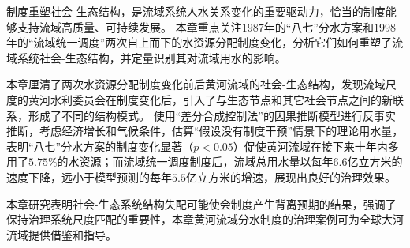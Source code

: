 制度重塑社会-生态结构，是流域系统人水关系变化的重要驱动力，恰当的制度能够支持流域高质量、可持续发展。
本章重点关注$1987$年的“八七”分水方案和$1998$年的“流域统一调度”两次自上而下的水资源分配制度变化，分析它们如何重塑了流域系统社会-生态结构，并定量识别其对流域用水的影响。

本章厘清了两次水资源分配制度变化前后黄河流域的社会-生态结构，发现流域尺度的黄河水利委员会在制度变化后，引入了与生态节点和其它社会节点之间的新联系，形成了不同的结构模式。
使用“差分合成控制法”的因果推断模型进行反事实推断，考虑经济增长和气候条件，估算“假设没有制度干预”情景下的理论用水量，表明“八七”分水方案的制度变化显著（$p<0.05$）促使黄河流域在接下来十年内多用了$5.75\%$的水资源；而流域统一调度制度后，流域总用水量以每年$6.6$亿立方米的速度下降，远小于模型预测的每年$5.5$亿立方米的增速，展现出良好的治理效果。

本章研究表明社会-生态系统结构失配可能使会制度产生背离预期的结果，强调了保持治理系统尺度匹配的重要性，本章黄河流域分水制度的治理案例可为全球大河流域提供借鉴和指导。
